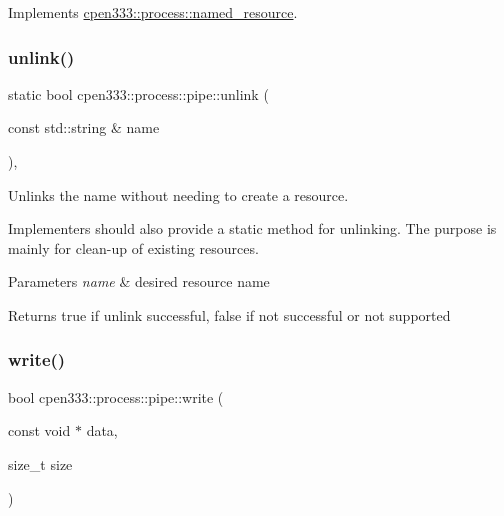 Implements \hyperlink{classcpen333_1_1process_1_1named__resource_a5d33168fee48c9b0c58ab8fd96e230ce}{cpen333\+::process\+::named\+\_\+resource}.

\mbox{\label{classcpen333_1_1process_1_1pipe_ad0d66f9fc3712849b6af36ca7d19e54d}} 
\subsubsection{\texorpdfstring{unlink()}{unlink()}\hspace{0.1cm}{\footnotesize\ttfamily [2/2]}}
{\footnotesize\ttfamily static bool cpen333\+::process\+::pipe\+::unlink (\begin{DoxyParamCaption}\item[{const std\+::string \&}]{name }\end{DoxyParamCaption})\hspace{0.3cm}{\ttfamily [inline]}, {\ttfamily [static]}}



Unlinks the name without needing to create a resource. 

Implementers should also provide a static method for unlinking. The purpose is mainly for clean-\/up of existing resources.


\begin{DoxyParams}{Parameters}
{\em name} & desired resource name \\
\hline
\end{DoxyParams}
\begin{DoxyReturn}{Returns}
{\ttfamily true} if unlink successful, {\ttfamily false} if not successful or not supported 
\end{DoxyReturn}
\mbox{\label{classcpen333_1_1process_1_1pipe_afa2e2598bf72fa411b4b96bbf88d2f4b}} 
\subsubsection{\texorpdfstring{write()}{write()}\hspace{0.1cm}{\footnotesize\ttfamily [1/3]}}
{\footnotesize\ttfamily bool cpen333\+::process\+::pipe\+::write (\begin{DoxyParamCaption}\item[{const void $\ast$}]{data,  }\item[{size\+\_\+t}]{size }\end{DoxyParamCaption})\hspace{0.3cm}{\ttfamily [inline]}}



